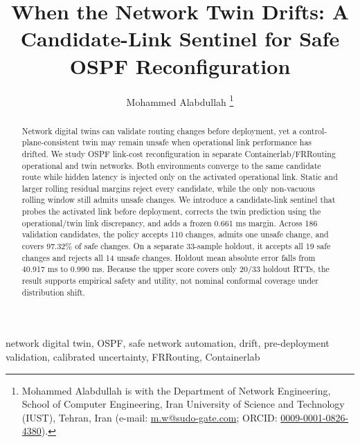 \documentclass[journal]{IEEEtran}
\title{When the Network Twin Drifts: A Candidate-Link Sentinel for Safe OSPF Reconfiguration}
\author{Mohammed Alabdullah%
\thanks{Mohammed Alabdullah is with the Department of Network Engineering,
School of Computer Engineering, Iran University of Science and Technology
(IUST), Tehran, Iran (e-mail: \href{mailto:m.w@sudo-gate.com}{m.w@sudo-gate.com};
ORCID: \href{https://orcid.org/0009-0001-0826-4380}{0009-0001-0826-4380}).}}
\begin{document}
\maketitle

\begin{abstract}
Network digital twins can validate routing changes before deployment, yet a control-plane-consistent twin may remain unsafe when operational link performance has drifted. We study OSPF link-cost reconfiguration in separate Containerlab/FRRouting operational and twin networks. Both environments converge to the same candidate route while hidden latency is injected only on the activated operational link. Static and larger rolling residual margins reject every candidate, while the only non-vacuous rolling window still admits unsafe changes. We introduce a candidate-link sentinel that probes the activated link before deployment, corrects the twin prediction using the operational/twin link discrepancy, and adds a frozen 0.661 ms margin. Across 186 validation candidates, the policy accepts 110 changes, admits one unsafe change, and covers 97.32\% of safe changes. On a separate 33-sample holdout, it accepts all 19 safe changes and rejects all 14 unsafe changes. Holdout mean absolute error falls from 40.917 ms to 0.990 ms. Because the upper score covers only 20/33 holdout RTTs, the result supports empirical safety and utility, not nominal conformal coverage under distribution shift.
\end{abstract}

\begin{IEEEkeywords}
network digital twin, OSPF, safe network automation, drift, pre-deployment validation, calibrated uncertainty, FRRouting, Containerlab
\end{IEEEkeywords}












\end{document}
